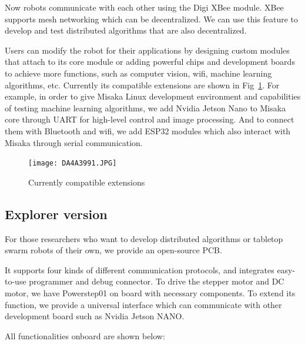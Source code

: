 \documentclass[sigconf]{acmart}
\begin{document}
Now robots communicate with each other using the Digi XBee module. XBee supports mesh networking which can be decentralized. We can use this feature to develop and test distributed algorithms that are also decentralized.

Users can modify the robot for their applications by designing custom modules that attach to its core module or adding powerful chips and development boards to achieve more functions, such as computer vision, wifi, machine learning algorithms, etc. Currently its compatible extensions are shown in Fig~\ref{fig:extensions}. For example, in order to give Misaka Linux development environment and capabilities of testing machine learning algorithms, we add Nvidia Jetson Nano to Misaka core through UART for high-level control and image processing. And to connect them with Bluetooth and wifi, we add ESP32 modules which also interact with Misaka through serial communication.\cite{zhang2020misaka}

\begin{figure}[h]
  \centering
  \texttt{[image: DA4A3991.JPG]}
  \caption{Currently compatible extensions}
  \label{fig:extensions}
\end{figure}

\subsection{Explorer version}

For those researchers who want to develop distributed algorithms or tabletop swarm robots of their own, we provide an open-source PCB. 

It supports four kinds of different communication protocols, and integrates easy-to-use programmer and debug connector. To drive the stepper motor and DC motor, we have Powerstep01 on board with necessary components.
To extend its function, we provide a universal interface which can communicate with other development board such as Nvidia Jetson NANO.

All functionalities onboard are shown below:
\end{document}
